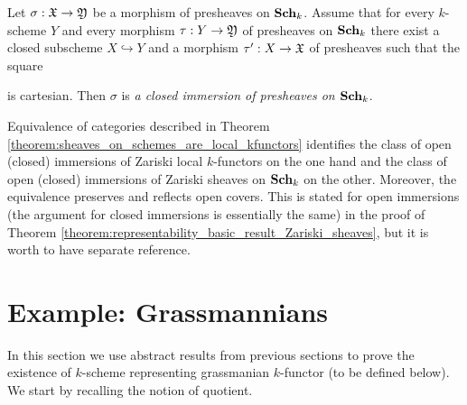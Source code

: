 \begin{definition}
Let $\sigma:{\mathfrak X}\rightarrow {\mathfrak Y}$ be a morphism of presheaves on $\mathbf{Sch}_k$. Assume that for every $k$-scheme $Y$ and every morphism $\tau:Y \rightarrow {\mathfrak Y}$ of presheaves on $\mathbf{Sch}_k$ there exist a closed subscheme $X\hookrightarrow Y$ and a morphism $\tau':X \rightarrow {\mathfrak X}$ of presheaves such that the square
\begin{center}
\end{center}
is cartesian. Then $\sigma$ is \textit{a closed immersion of presheaves on $\mathbf{Sch}_k$}.
\end{definition}

\begin{remark}\label{remark:open_and_closed_immersions_for_Zariski_local_and_Zariski_sheaves_are_the_same}
Equivalence of categories described in Theorem \ref{theorem:sheaves_on_schemes_are_local_kfunctors} identifies the class of open (closed) immersions of Zariski local $k$-functors on the one hand and the class of open (closed) immersions of Zariski sheaves on $\mathbf{Sch}_k$ on the other. Moreover, the equivalence preserves and reflects open covers. This is stated for open immersions (the argument for closed immersions is essentially the same) in the proof of Theorem \ref{theorem:representability_basic_result_Zariski_sheaves}, but it is worth to have separate reference.
\end{remark}

\section{Example: Grassmannians}
\noindent
In this section we use abstract results from previous sections to prove the existence of $k$-scheme representing grassmanian $k$-functor (to be defined below). We start by recalling the notion of quotient.

